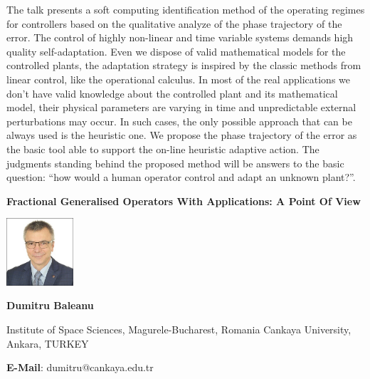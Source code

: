 \documentclass[twoside,11pt]{amsart}
\begin{document}
\vskip 8mm
The talk presents a soft computing identification method of the operating
regimes for controllers based on the qualitative analyze of the phase trajectory of
the error. The control of highly non-linear and time variable systems demands high
quality self-adaptation. Even we dispose of valid mathematical models for the
controlled plants, the adaptation strategy is inspired by the classic methods from
linear control, like the operational calculus. In most of the real applications we
don’t have valid knowledge about the controlled plant and its mathematical model,
their physical parameters are varying in time and unpredictable external
perturbations may occur. In such cases, the only possible approach that can be
always used is the heuristic one. We propose the phase trajectory of the error as the
basic tool able to support the on-line heuristic adaptive action. The judgments
standing behind the proposed method will be answers to the basic question: “how
would a human operator control and adapt an unknown plant?”.




\newpage




\vskip 10mm
\begin{center}\bf\LARGE
Fractional Generalised Operators With Applications: A Point Of View
\end{center}
\vskip 5mm
\begin{center}
\includegraphics[width=2.5cm, height=2.5cm,keepaspectratio=false]{DB2.jpg}
\end{center}
\vskip 2mm
\centerline{\textbf{  Dumitru Baleanu }}
\vskip 2mm
\begin{flushleft}
Institute of Space Sciences, Magurele-Bucharest, Romania
Cankaya University, Ankara, TURKEY
\end{flushleft}
\vskip 2mm
\begin{flushleft}
\textbf{E-Mail}: dumitru@cankaya.edu.tr
\end{flushleft}
\end{document}
